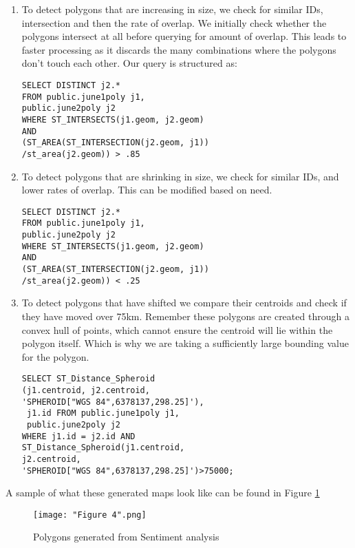 \documentclass[conference]{IEEEtran}
\begin{document}
\begin{enumerate}
	\item To detect polygons that are increasing in size, we check for similar IDs, intersection and then the rate of overlap. We initially check whether the polygons intersect at all before querying for amount of overlap. This leads to faster processing as it discards the many combinations where the polygons don't touch each other. Our query is structured as:
\begin{lstlisting}
SELECT DISTINCT j2.* 
FROM public.june1poly j1,
public.june2poly j2 
WHERE ST_INTERSECTS(j1.geom, j2.geom)
AND  
(ST_AREA(ST_INTERSECTION(j2.geom, j1))
/st_area(j2.geom)) > .85
\end{lstlisting}

	\item To detect polygons that are shrinking  in size, we check for similar IDs, and lower rates of overlap. This can be modified based on need.
\begin{lstlisting}
SELECT DISTINCT j2.* 
FROM public.june1poly j1,
public.june2poly j2 
WHERE ST_INTERSECTS(j1.geom, j2.geom)
AND  
(ST_AREA(ST_INTERSECTION(j2.geom, j1))
/st_area(j2.geom)) < .25
\end{lstlisting}	

	\item To detect polygons that have shifted we compare their centroids and check if they have moved over 75km. Remember these polygons are created through a convex hull of points, which cannot ensure the centroid will lie within the polygon itself. Which is why we are taking a sufficiently large bounding value for the polygon.
\begin{lstlisting}
SELECT ST_Distance_Spheroid
(j1.centroid, j2.centroid, 
'SPHEROID["WGS 84",6378137,298.25]'), 
 j1.id FROM public.june1poly j1, 
 public.june2poly j2 
WHERE j1.id = j2.id AND 
ST_Distance_Spheroid(j1.centroid, 
j2.centroid, 
'SPHEROID["WGS 84",6378137,298.25]')>75000;
\end{lstlisting}	

\end{enumerate}

A sample of what these generated maps look like can be found in Figure \ref{Figure 4}

\begin{figure}[ht]
\centerline{\texttt{[image: "Figure 4".png]}}
\caption{Polygons generated from Sentiment analysis}
\label{Figure 4}
\end{figure}
\end{document}
